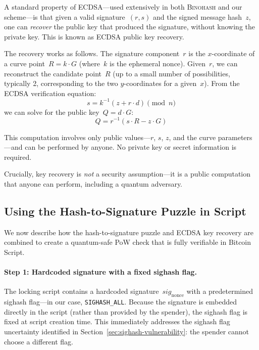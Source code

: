 \documentclass[11pt, a4paper]{article}
\begin{document}
A standard property of ECDSA---used extensively in both \textsc{Binohash} and our scheme---is that given a valid signature~$(r, s)$ and the signed message hash~$z$, one can \emph{recover} the public key that produced the signature, without knowing the private key. This is known as ECDSA public key recovery.

The recovery works as follows. The signature component~$r$ is the $x$-coordinate of a curve point~$R = k \cdot G$ (where~$k$ is the ephemeral nonce). Given~$r$, we can reconstruct the candidate point~$R$ (up to a small number of possibilities, typically 2, corresponding to the two $y$-coordinates for a given~$x$). From the ECDSA verification equation:
$$s = k^{-1}(z + r \cdot d) \pmod{n}$$
we can solve for the public key~$Q = d \cdot G$:
$$Q = r^{-1}(s \cdot R - z \cdot G)$$

This computation involves only public values---$r$, $s$, $z$, and the curve parameters---and can be performed by anyone. No private key or secret information is required.

Crucially, key recovery is \emph{not} a security assumption---it is a public computation that anyone can perform, including a quantum adversary.

\subsection{Using the Hash-to-Signature Puzzle in Script}
\label{sec:puzzle-in-script}

We now describe how the hash-to-signature puzzle and ECDSA key recovery are combined to create a quantum-safe PoW check that is fully verifiable in Bitcoin Script.

\paragraph{Step 1: Hardcoded signature with a fixed sighash flag.}
The locking script contains a hardcoded signature~$\mathit{sig}_{\mathrm{nonce}}$ with a predetermined sighash flag---in our case, \texttt{SIGHASH\_ALL}. Because the signature is embedded directly in the script (rather than provided by the spender), the sighash flag is fixed at script creation time. This immediately addresses the sighash flag uncertainty identified in Section~\ref{sec:sighash-vulnerability}: the spender cannot choose a different flag.
\end{document}

